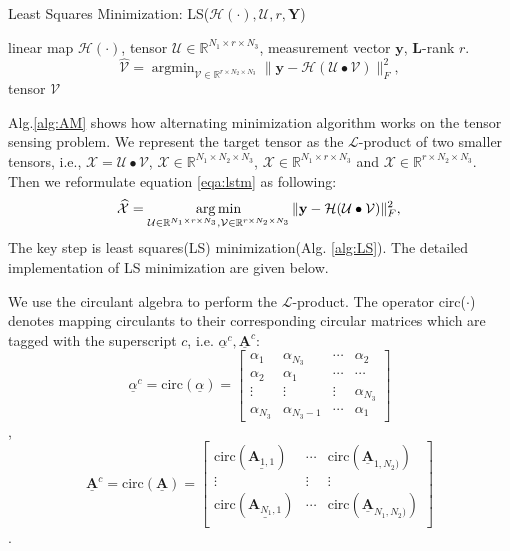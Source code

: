 \documentclass[journal,article,submit,moreauthors,pdftex,10pt,a4paper]{Definitions/mdpi}
\theoremstyle{plain}
\theoremstyle{definition}
\theoremstyle{remark}
\begin{document}
\begin{algorithm}[htb]
    \caption{Least Squares Minimization: LS($\mathcal{H}(\cdot), \mathcal{U}, r, \mathbf{Y}$)}
    \label{alg:LS}
    \begin{algorithmic}[2]
        \Require
        linear map $\mathcal{H}(\cdot)$, tensor $\mathcal{U} \in \mathbb{R}^{N_1\times r \times N_3}$, measurement vector $\mathbf{y}$, $\mathbf{L}$-rank $r$.
    \State \[
    \widehat{\mathcal{V}} = \mathop{\arg\min}_{\mathcal{V} \in \mathbb{R}^{r \times N_2 \times N_3}}\| \mathbf{y} - \mathcal{H}(\mathcal{U} \bullet \mathcal{V}) \|_F^2 , 
    \]
    \Ensure tensor $\mathcal{V}$
    \end{algorithmic}
\end{algorithm}
Alg.\ref{alg:AM} shows how alternating minimization algorithm works on the tensor sensing problem. We represent the target tensor as the $\mathcal{L}$-product of two smaller tensors, i.e., $\mathcal{X} = \mathcal{U} \bullet \mathcal{V}$, $\mathcal{X} \in \mathbb{R}^{N_1 \times N_2 \times N_3}$, $\mathcal{X} \in \mathbb{R}^{N_1 \times r \times N_3}$ and $\mathcal{X} \in \mathbb{R}^{r \times N_2 \times N_3}$.
Then we reformulate equation \eqref{eqa:lstm} as following:
\begin{equation}
    \widehat{\mathcal{X}} =
    \mathop{\arg\min}_{ \mathcal{U} \in \mathbb{R}^{N_1 \times r \times N_3}, \mathcal{V} \in \mathbb{R}^{r \times N_2 \times N_3}}\| \mathbf{y} - \mathcal{H}(\mathcal{U} \bullet \mathcal{V}) \|_F^2 , \\
\end{equation}
The key step is least squares(LS) minimization(Alg. \ref{alg:LS}). The detailed implementation of LS minimization are given below.

We use the circulant algebra\cite{liu2016low, gleich2013power} to perform the $\mathcal{L}$-product. The operator circ($\cdot$) denotes mapping circulants to their corresponding circular matrices which are tagged with the superscript $c$, i.e. $\underline{\alpha}^c, \underline{\mathbf{A}}^c$:
\[
    \underline{\alpha}^c = \text{circ}(\underline{\alpha}) = \begin{bmatrix}
        \alpha_1 & \alpha_{N_3} & \cdots  & \alpha_2 \\
        \alpha_2 & \alpha_1 & \cdots & \cdots \\
        \vdots & \vdots & \vdots & \alpha_{N_3} \\
        \alpha_{N_3} & \alpha_{N_3-1} & \cdots & \alpha_1
    \end{bmatrix}
    \],
    \[
        \underline{\mathbf{A}}^c = \text{circ}(\underline{\mathbf{A}}) = \begin{bmatrix}
            \text{circ}(\underline{\mathbf{A}_{1,1}})  & \cdots & \text{circ}(\underline{\mathbf{A}}_{1,N_2)}) \\
            \vdots & \vdots & \vdots \\
            \text{circ}(\underline{\mathbf{A}_{N_1,1}})  & \cdots & \text{circ}(\underline{\mathbf{A}}_{N_1,N_2)}) \\
        \end{bmatrix}
        \].
\end{document}

